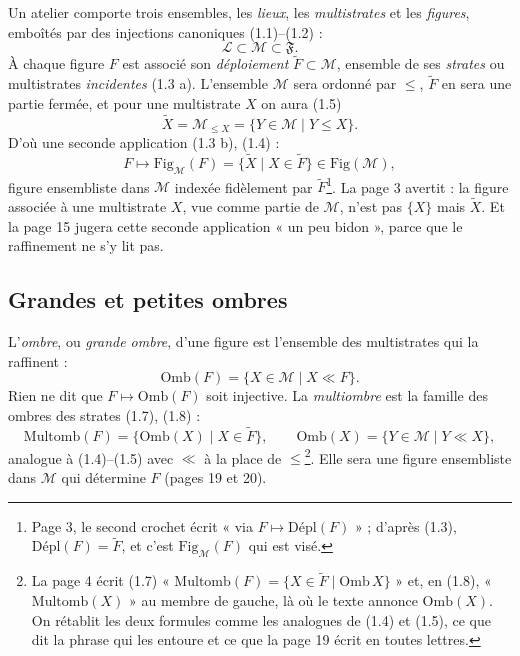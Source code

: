 \documentclass[11pt,a4paper]{article}
\begin{document}
Un atelier comporte trois ensembles, les \emph{lieux}, les \emph{multistrates} et
les \emph{figures}, emboîtés par des injections canoniques (1.1)--(1.2) :
\[
\mathcal{L} \subset \mathcal{M} \subset \mathfrak{F} .
\]
À chaque figure $F$ est associé son \emph{déploiement} $\widetilde{F} \subset
\mathcal{M}$, ensemble de ses \emph{strates} ou multistrates \emph{incidentes}
(1.3 a). L'ensemble $\mathcal{M}$ sera ordonné par $\leq$, $\widetilde{F}$ en sera
une partie fermée, et pour une multistrate $X$ on aura (1.5)
\[
\widetilde{X} = \mathcal{M}_{\leq X} = \lbrace Y \in \mathcal{M} \mid Y \leq X
\rbrace .
\]
D'où une seconde application (1.3 b), (1.4) :
\[
F \longmapsto \mathrm{Fig}_{\mathcal{M}}(F) = \lbrace \widetilde{X} \mid X \in
\widetilde{F} \rbrace \in \mathrm{Fig}(\mathcal{M}) ,
\]
figure ensembliste dans $\mathcal{M}$ indexée fidèlement par
$\widetilde{F}$\footnote{Page 3, le second crochet écrit « via $F \mapsto
\mathrm{Dépl}(F)$ » ; d'après (1.3), $\mathrm{Dépl}(F) = \widetilde{F}$, et c'est
$\mathrm{Fig}_{\mathcal{M}}(F)$ qui est visé.}. La page 3 avertit : la figure
associée à une multistrate $X$, vue comme partie de $\mathcal{M}$, n'est pas
$\lbrace X \rbrace$ mais $\widetilde{X}$. Et la page 15 jugera cette seconde
application « un peu bidon », parce que le raffinement ne s'y lit pas.

\subsection*{Grandes et petites ombres}

L'\emph{ombre}, ou \emph{grande ombre}, d'une figure est l'ensemble des
multistrates qui la raffinent :
\[
\mathrm{Omb}(F) = \lbrace X \in \mathcal{M} \mid X \ll F \rbrace .
\]
Rien ne dit que $F \mapsto \mathrm{Omb}(F)$ soit injective. La \emph{multiombre}
est la famille des ombres des strates (1.7), (1.8) :
\[
\mathrm{Multomb}(F) = \lbrace \mathrm{Omb}(X) \mid X \in \widetilde{F} \rbrace,
\qquad \mathrm{Omb}(X) = \lbrace Y \in \mathcal{M} \mid Y \ll X \rbrace
,
\]
analogue à (1.4)--(1.5) avec $\ll$ à la place de $\leq$\footnote{La page 4 écrit
(1.7) « $\mathrm{Multomb}(F) = \lbrace X \in \widetilde{F} \mid \mathrm{Omb}\,X
\rbrace$ » et, en (1.8), « $\mathrm{Multomb}(X)$ » au membre de gauche, là où le
texte annonce $\mathrm{Omb}(X)$. On rétablit les deux formules comme les
analogues de (1.4) et (1.5), ce que dit la phrase qui les entoure et ce que la
page 19 écrit en toutes lettres.}. Elle sera une figure ensembliste dans
$\mathcal{M}$ qui détermine $F$ (pages 19 et 20).
\end{document}
